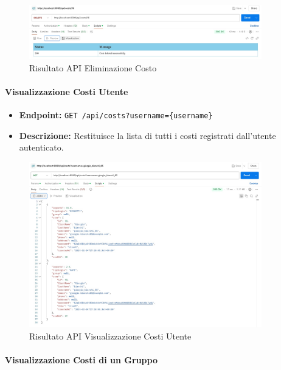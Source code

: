 \begin{figure}[h!]
    \centering
    \includegraphics[width=0.9\textwidth]{images/deleteCost.jpeg}
    \caption{Risultato API Eliminazione Costo}
    \label{fig:api_delete_cost}
\end{figure}

\paragraph{Visualizzazione Costi Utente}  

\begin{itemize}
    \item \textbf{Endpoint:} \texttt{GET /api/costs?username=\{username\}}
    \item \textbf{Descrizione:} Restituisce la lista di tutti i costi registrati dall'utente autenticato.
\end{itemize}

\begin{figure}[h!]
    \centering
    \includegraphics[width=0.9\textwidth]{images/getUserCosts.jpeg}
    \caption{Risultato API Visualizzazione Costi Utente}
    \label{fig:api_view_user_costs}
\end{figure}

\paragraph{Visualizzazione Costi di un Gruppo}  

